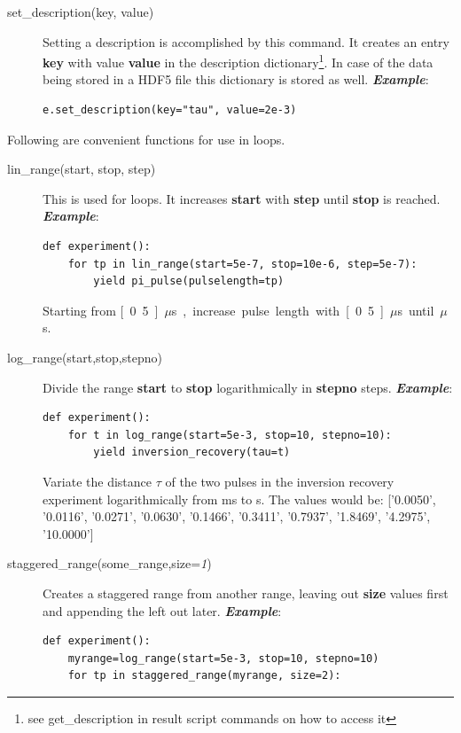 \documentclass[12pt, a4paper, BCOR10mm, twoside, titlepage, headinclude]{scrbook}
\begin{document}
\begin{description}
\item[set\_description(key, value)]
Setting a description is accomplished by this command. It creates an entry  \textbf{key} with value \textbf{value} in the description dictionary\footnote{see get\_description in result script commands on how to access it}. In case of the data being stored in a \textsf{HDF5} file this dictionary is stored as well. 
\newline
\emph{\textbf{Example}}:
\begin{lstlisting}
e.set_description(key="tau", value=2e-3)
\end{lstlisting}
\end{description}
Following are convenient functions for use in loops.
\begin{description}
\item[lin\_range(start, stop, step)] This is used for loops. It increases \textbf{start} with \textbf{step} until \textbf{stop} is reached.
\newline
\emph{\textbf{Example}}:
\begin{lstlisting}
def experiment():
	for tp in lin_range(start=5e-7, stop=10e-6, step=5e-7):
		yield pi_pulse(pulselength=tp)
\end{lstlisting}
Starting from \unit[0.5]{$\mu$s}, increase pulse length with \unit[0.5]{$\mu$s} until \unit[10]{$\mu$s}.
\item[log\_range(start,stop,stepno)] Divide the range \textbf{start} to \textbf{stop} logarithmically in \textbf{stepno} steps.
\newline
\emph{\textbf{Example}}:
\begin{lstlisting}
def experiment():
	for t in log_range(start=5e-3, stop=10, stepno=10):
		yield inversion_recovery(tau=t)
\end{lstlisting}
Variate the distance $\tau$ of the two pulses in the inversion recovery experiment logarithmically from \unit[5]{ms} to \unit[10]{s}. The values would be:
['0.0050', '0.0116', '0.0271', '0.0630', '0.1466', '0.3411',
       '0.7937', '1.8469', '4.2975', '10.0000']
\item[staggered\_range(some\_range,size=\textit{1})] Creates a staggered range from another range, leaving out \textbf{size} values first and appending the left  out  later.
\newline
\emph{\textbf{Example}}:
\begin{lstlisting}
def experiment():
	myrange=log_range(start=5e-3, stop=10, stepno=10)
	for tp in staggered_range(myrange, size=2):

\end{lstlisting}
\end{description}
\end{document}
